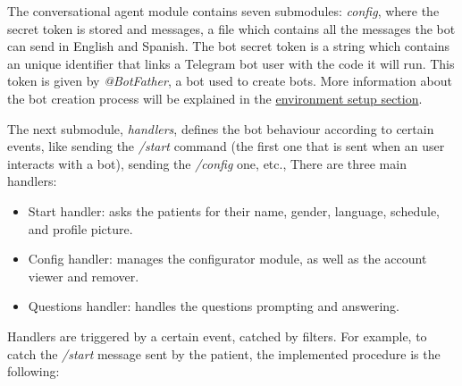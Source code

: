 \documentclass[12pt,english]{article}
\begin{document}
The conversational agent module contains seven submodules: \emph{config}, where the secret token is stored and messages, a file which contains all the messages the bot can send in English and Spanish. The bot secret token is a string which contains an unique identifier that links a Telegram bot user with the code it will run. This token is given by \emph{@BotFather}, a bot used to create bots. More information about the bot creation process will be explained in the \hyperref[sec:env_setup]{environment setup section}.

The next submodule, \emph{handlers}, defines the bot behaviour according to certain events, like sending the \emph{/start} command (the first one that is sent when an user interacts with a bot), sending the {\emph{/config}} one, etc., There are three main handlers:
\begin{itemize}
  \item Start handler: asks the patients for their name, gender, language, schedule, and profile picture.
  \item Config handler: manages the configurator module, as well as the account viewer and remover.
  \item Questions handler: handles the questions prompting and answering.
\end{itemize}

Handlers are triggered by a certain event, catched by filters. For example, to catch the \emph{/start} message sent by the patient, the implemented procedure is the following:
\end{document}
